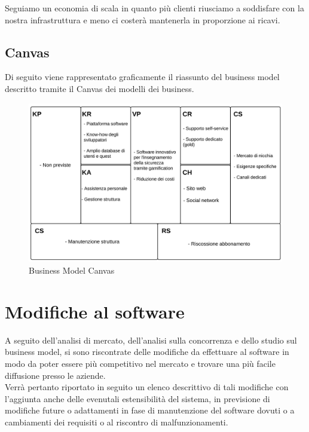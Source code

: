 Seguiamo un economia di scala in quanto più clienti riusciamo a soddisfare con la nostra infrastruttura e meno ci costerà mantenerla in proporzione ai ricavi. 

\newpage

\subsection{Canvas}

Di seguito viene rappresentato graficamente il riassunto del business model descritto tramite il Canvas dei modelli dei business.

\begin{figure}[H]
\centering
\includegraphics[scale=0.8]{images/BM.png}
\caption{Business Model Canvas}
\end{figure}


\section{Modifiche al software}
A seguito dell'analisi di mercato, dell'analisi sulla concorrenza e dello studio sul business model, si sono riscontrate delle modifiche da effettuare al software in modo da poter essere più competitivo nel mercato e trovare una più facile diffusione presso le aziende.\\
Verrà pertanto riportato in seguito un elenco descrittivo di tali modifiche con l'aggiunta anche delle evenutali estensibilità del sistema, in previsione di modifiche future o adattamenti in fase di manutenzione del software dovuti o a cambiamenti dei requisiti o al riscontro di malfunzionamenti.


